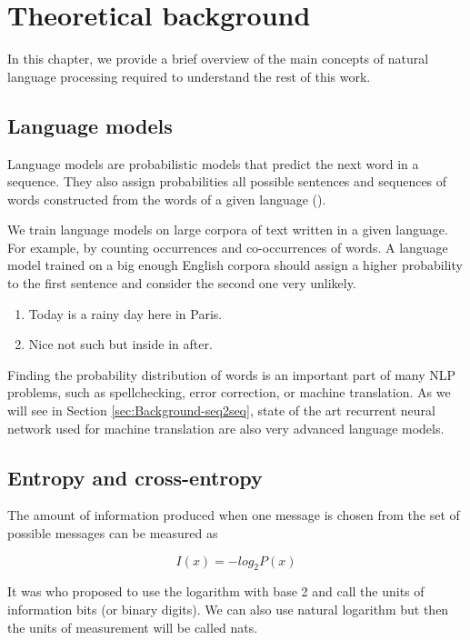 \chapter{Theoretical background}
\label{chap:Background}
\mtoc

In this chapter, we provide a brief overview of the main concepts of natural language processing required to understand the rest of this work.

\section{Language models}
\label{sec:Background-LanguageModels}

Language models are probabilistic models that predict the next word in a sequence. They also assign probabilities all possible sentences and sequences of words constructed from the words of a given language (\cite{Jura09}).

We train language models on large corpora of text written in a given language. For example, by counting occurrences and co-occurrences of words. A language model trained on a big enough English corpora should assign a higher probability to the first sentence and consider the second one very unlikely.

\begin{enumerate}
\item Today is a rainy day here in Paris.
\item Nice not such but inside in after.
\end{enumerate}

Finding the probability distribution of words is an important part of many NLP problems, such as spellchecking, error correction, or machine translation. As we will see in Section \ref{sec:Background-seq2seq}, state of the art recurrent neural network used for machine translation are also very advanced language models.

\section{Entropy and cross-entropy}

The amount of information produced when one message is chosen from the set of possible messages can be measured as

\[ I(x) = -log_2 P(x) \]

It was \cite{Shan48} who proposed to use the logarithm with base 2 and call the units of information bits (or binary digits). We can also use natural logarithm but then the units of measurement will be called nats.

